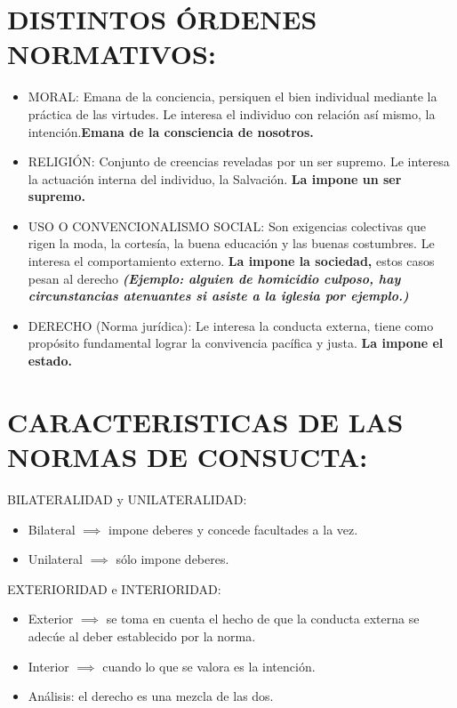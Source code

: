 \section{DISTINTOS ÓRDENES NORMATIVOS:}
\begin{itemize}
\item MORAL:  Emana de la conciencia, persiquen el bien individual mediante la práctica de las virtudes. Le interesa el individuo con relación así mismo, la intención.\textbf{Emana de la consciencia de nosotros.}
   
\item RELIGIÓN: Conjunto de creencias reveladas por un ser supremo. Le interesa la actuación interna del individuo, la Salvación. \textbf{La impone un ser supremo.}
 
\item USO O CONVENCIONALISMO  SOCIAL: Son exigencias colectivas que rigen la moda, la cortesía, la buena educación y las buenas costumbres. Le interesa el comportamiento  externo. \textbf{La impone la sociedad,} estos casos pesan al derecho \textbf{\emph{(Ejemplo: alguien de homicidio culposo, hay circunstancias atenuantes si asiste a la iglesia por ejemplo.)}}

\item DERECHO (Norma jurídica):  Le interesa la conducta externa, tiene como propósito fundamental lograr la convivencia pacífica y justa. \textbf{La impone el estado.}
\end{itemize}


\section{CARACTERISTICAS DE LAS NORMAS DE CONSUCTA:}
BILATERALIDAD  y  UNILATERALIDAD:  
\begin{itemize}
\item Bilateral $\implies $ impone deberes y concede facultades a la vez.
\item Unilateral $\implies $  sólo impone deberes.
\end{itemize}

EXTERIORIDAD e INTERIORIDAD: 
\begin{itemize} 
\item Exterior $\implies $ se toma en cuenta el hecho de que la conducta externa se   adecúe al deber establecido por la norma.  
\item Interior $\implies $ cuando lo que se valora es la intención.

\item Análisis: el derecho es una mezcla de las dos.
\end{itemize}


